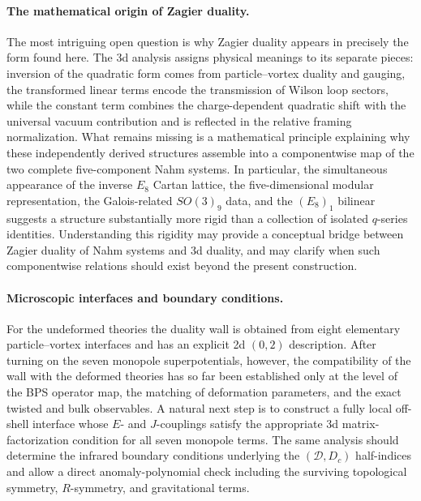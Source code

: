 \documentclass[11pt,a4paper]{article}
\numberwithin{equation}{section}
\begin{document}
\paragraph{The mathematical origin of Zagier duality.}
The most intriguing open question is why Zagier duality appears in precisely the form found here.  The 3d analysis assigns physical meanings to its separate pieces: inversion of the quadratic form comes from particle--vortex duality and gauging, the transformed linear terms encode the transmission of Wilson loop sectors, while the constant term combines the charge-dependent quadratic shift with the universal vacuum contribution and is reflected in the relative framing normalization.  What remains missing is a mathematical principle explaining why these independently derived structures assemble into a componentwise map of the two complete five-component Nahm systems.  In particular, the simultaneous appearance of the inverse $E_8$ Cartan lattice, the five-dimensional modular representation, the Galois-related $SO(3)_9$ data, and the $(E_8)_1$ bilinear suggests a structure substantially more rigid than a collection of isolated $q$-series identities.  Understanding this rigidity may provide a conceptual bridge between Zagier duality of Nahm systems and 3d duality, and may clarify when such componentwise relations should exist beyond the present construction.

\paragraph{Microscopic interfaces and boundary conditions.}
For the undeformed theories the duality wall is obtained from eight elementary particle--vortex interfaces and has an explicit 2d $(0,2)$ description.  After turning on the seven monopole superpotentials, however, the compatibility of the wall with the deformed theories has so far been established only at the level of the BPS operator map, the matching of deformation parameters, and the exact twisted and bulk observables.  A natural next step is to construct a fully local off-shell interface whose $E$- and $J$-couplings satisfy the appropriate 3d matrix-factorization condition for all seven monopole terms.  The same analysis should determine the infrared boundary conditions underlying the $(\mathcal D,D_c)$ half-indices and allow a direct anomaly-polynomial check including the surviving topological symmetry, $R$-symmetry, and gravitational terms.
\end{document}

